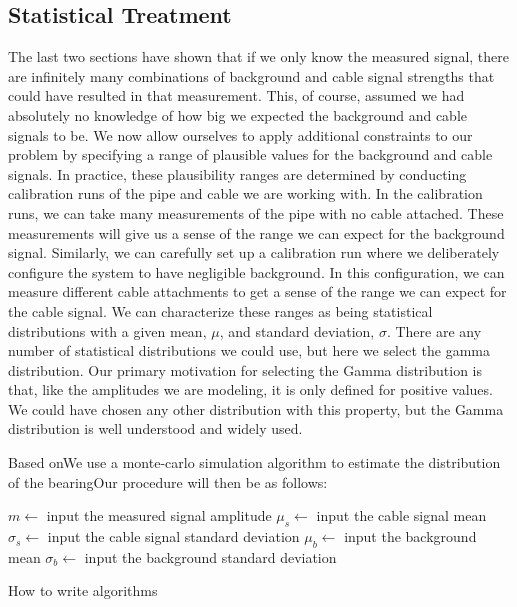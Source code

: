 \documentclass[paper=a4, fontsize=11pt]{scrartcl}
\numberwithin{equation}{section}		%
\numberwithin{figure}{section}			%
\numberwithin{table}{section}				%
\begin{document}
\begin{appendices}
\section{Statistical Treatment}
The last two sections have shown that if we only know the measured signal, there are infinitely many combinations of background and cable signal strengths that could have resulted in that measurement.  This, of course, assumed we had absolutely no knowledge of how big we expected the background and cable signals to be.  We now allow ourselves to apply additional constraints to our problem by specifying a range of plausible values for the background and cable signals.  In practice, these plausibility ranges are determined by conducting calibration runs of the pipe and cable we are working with.  In the calibration runs, we can take many measurements of the pipe with no cable attached.  These measurements will give us a sense of the range we can expect for the background signal.  Similarly, we can carefully set up a calibration run where we deliberately configure the system to have negligible background.  In this configuration, we can measure different cable attachments to get a sense of the range we can expect for the cable signal.  We can characterize these ranges as being statistical distributions with a given mean, $\mu$, and standard deviation, $\sigma$. There are any number of statistical distributions we could use, but here we select the gamma distribution.  Our primary motivation for selecting the Gamma distribution is that, like the amplitudes we are modeling, it is only defined for positive values.  We could have chosen any other distribution with this property, but the Gamma distribution is well understood and widely used. 

\par Based onWe use a monte-carlo simulation algorithm to estimate the distribution of the bearingOur procedure will then be as follows:

% 


\begin{algorithm}[H]
\SetAlgoLined
{}
 $m \leftarrow$ input the measured signal amplitude\;
 $\mu_s \leftarrow$ input the cable signal mean\;
 $\sigma_s \leftarrow$ input the cable signal standard deviation\;
 $\mu_b \leftarrow$ input the background mean\;
 $\sigma_b \leftarrow$ input the background standard deviation\;
 
 
 \caption{How to write algorithms}
\end{algorithm}








\end{appendices}
\end{document}
